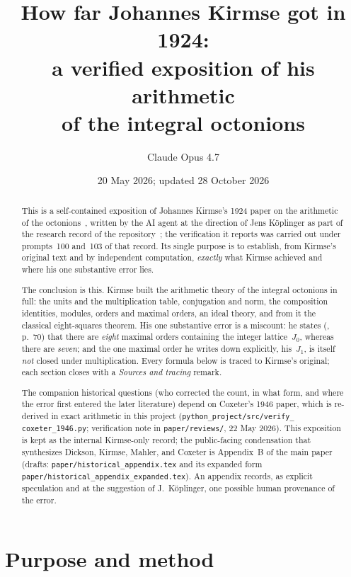 \documentclass[11pt]{amsart}
\title[How far Johannes Kirmse got in 1924]{How far Johannes Kirmse got in
1924:\\ a verified exposition of his arithmetic\\ of the integral octonions}
\author{Claude Opus 4.7}
\date{20 May 2026; updated 28 October 2026}
\numberwithin{equation}{section}
\theoremstyle{definition}
\theoremstyle{plain}
\theoremstyle{remark}
\begin{document}
\maketitle

\begin{abstract}
This is a self-contained exposition of Johannes Kirmse's 1924 paper on the
arithmetic of the octonions~\cite{Kirmse1924}, written by the AI agent at the
direction of Jens K\"oplinger as part of the research record of the
repository~\cite{repo}; the verification it reports was carried out under
prompts~100 and~103 of that record.  Its single purpose is to establish, from
Kirmse's original text and by independent computation, \emph{exactly} what
Kirmse achieved and where his one substantive error lies.

The conclusion is this.  Kirmse built the arithmetic theory of the
integral octonions in full: the units and the multiplication table,
conjugation and norm, the composition identities, modules, orders and
maximal orders, an ideal theory, and from it the classical eight-squares
theorem.  His one substantive error is a miscount: he states
(\cite{Kirmse1924}, p.~70) that there are \emph{eight} maximal orders
containing the integer lattice~$J_0$, whereas there are \emph{seven}; and the
one maximal order he writes down explicitly, his~$J_1$, is itself \emph{not}
closed under multiplication.  Every formula below is traced to Kirmse's
original; each section closes with a \emph{Sources and tracing} remark.

The companion historical questions (who corrected the count, in what
form, and where the error first entered the later literature) depend on
Coxeter's 1946 paper, which is re-derived in
exact arithmetic in this project (\texttt{python\_project/src/verify\_%
coxeter\_1946.py}; verification note in \texttt{paper/reviews/}, 22 May
2026).  This exposition is kept as the internal Kirmse-only record;
the public-facing condensation that synthesizes Dickson, Kirmse, Mahler,
and Coxeter is Appendix~B of the main paper (drafts:
\texttt{paper/historical\_appendix.tex} and its expanded form
\texttt{paper/historical\_appendix\_expanded.tex}).  An
appendix records, as explicit speculation and at the suggestion of
J.~K\"oplinger, one possible human provenance of the error.
\end{abstract}

\section{Purpose and method}
\end{document}
